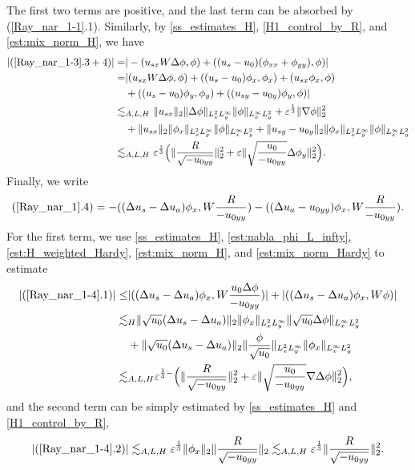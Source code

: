 \documentclass[reqno, 11pt]{amsart}
\theoremstyle{plain}
\theoremstyle{definition}
\theoremstyle{remark}
\numberwithin{equation}{section}
\begin{document}
The first two terms are positive, and the last term can be absorbed by (\ref{Ray_nar_1-1}.1). Similarly, by \eqref{ss_estimates_H}, \eqref{H1_control_by_R}, and \eqref{est:mix_norm_H}, we have
\begin{equation}\label{Ray_nar_1-3-3}
\begin{aligned}
|(\ref{Ray_nar_1-3}.3+4)| =& |-(u_{sx}W\Delta \phi,\phi)+((u_s-u_0)(\phi_{xx}+ \phi_{yy}),\phi)|\\
=& |(u_{sx}W\Delta \phi,\phi)
+ ((u_{s}-u_0) \phi_x, \phi_x) + (u_{sx} \phi_x, \phi)\\
& + ((u_{s}-u_0) \phi_y, \phi_y) + ((u_{sy}-u_{0y}) \phi_y, \phi)|\\
\lesssim&_{A,L,H}~ \|u_{sx}\|_2 \| \Delta \phi\|_{L^2_xL^\infty_y} \|\phi\|_{L^\infty_xL^2_y} + \varepsilon^{\frac{1}{3}} \|\nabla \phi\|_2^2\\
& + \|u_{sx}\|_2 \|  \phi_x\|_{L^2_xL^\infty_y} \|\phi\|_{L^\infty_xL^2_y} + \|u_{sy}-u_{0y}\|_2 \|  \phi_x\|_{L^2_xL^\infty_y} \|\phi\|_{L^\infty_xL^2_y}\\
\lesssim&_{A,L,H}~ \varepsilon^{\frac{1}{3}} \Big(  \|\frac{R}{\sqrt{-u_{0yy}}}\|_2^2 + \varepsilon \| \sqrt{\frac{u_0}{-u_{0yy}}} \Delta \phi_y\|_2^2 \Big).
\end{aligned}
\end{equation}
Finally, we write
\begin{equation}\label{Ray_nar_1-4}
(\ref{Ray_nar_1}.4) = - ((\Delta u_s - \Delta u_a) \phi_x, W \frac{R}{-u_{0yy}}) -((\Delta u_a - u_{0yy}) \phi_x, W \frac{R}{-u_{0yy}}).
\end{equation}
For the first term, we use \eqref{ss_estimates_H}, \eqref{est:nabla_phi_L_infty}, \eqref{est:H_weighted_Hardy}, \eqref{est:mix_norm_H}, and \eqref{est:mix_norm_Hardy} to estimate
\begin{equation}\label{Ray_nar_1-4-1}
\begin{aligned}
|(\ref{Ray_nar_1-4}.1)| \le& |((\Delta u_s - \Delta u_a) \phi_x, W \frac{u_0 \Delta\phi }{-u_{0yy}})| + |((\Delta u_s - \Delta u_a) \phi_x, W \phi)| \\
 \lesssim&_H \| \sqrt{u_0}(\Delta u_s - \Delta u_a)\|_{2} \| \phi_x\|_{L^2_xL^\infty_y} \|\sqrt{u_0} \Delta\phi \|_{L^\infty_xL^2_y}\\
  &+ \| \sqrt{u_0}(\Delta u_s - \Delta u_a)\|_{2}\| \frac{\phi}{\sqrt{u_0}}\|_{L^2_x L^\infty_y} \| \phi_x\|_{L^\infty_xL^2_y}\\
\lesssim&_{A,L,H} \varepsilon^{\frac{1}{3}-}  \Big( \|\frac{R}{\sqrt{-u_{0yy}}}\|_2^2 + \varepsilon \| \sqrt{\frac{u_0}{-u_{0yy}}} \nabla\Delta \phi\|_2^2\Big),
\end{aligned}
\end{equation}
and the second term can be simply estimated by \eqref{ss_estimates_H} and \eqref{H1_control_by_R},
\begin{equation}\label{Ray_nar_1-4-2}
\begin{aligned}
|(\ref{Ray_nar_1-4}.2)| \lesssim_{A,L,H}\varepsilon^{\frac{1}{3}} \| \phi_x\|_{2} \|\frac{R}{\sqrt{-u_{0yy}}}\|_2 \lesssim_{A,L,H}\varepsilon^{\frac{1}{3}}\|\frac{R}{\sqrt{-u_{0yy}}}\|_2^2.
\end{aligned}
\end{equation}
\end{document}
